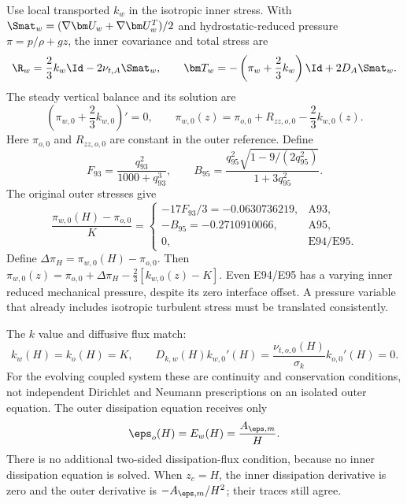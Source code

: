 Use local transported \(k_w\) in the isotropic inner stress.
With \(\Smat_w=(\nabla\bm U_w+\nabla\bm U_w^T)/2\) and
hydrostatic-reduced pressure \(\pi=p/\rho+gz\), the inner
covariance and total stress are
\begin{equation}
 \R_w=\frac23k_w\Id-2\nu_{t,A}\Smat_w,\qquad
 \bm T_w=-\left(\pi_w+\frac23k_w\right)\Id+2D_A\Smat_w .
 \label{mawf:stress}
\end{equation}
The steady vertical balance and its solution are
\begin{equation}
 \left(\pi_{w,0}+\frac23k_{w,0}\right)'=0,\qquad
 \boxed{\pi_{w,0}(z)=\pi_{o,0}+R_{zz,o,0}-\frac23k_{w,0}(z).}
 \label{mawf:pressure}
\end{equation}
Here \(\pi_{o,0}\) and \(R_{zz,o,0}\) are constant in the
outer reference. Define
\begin{equation}
 F_{93}=\frac{q_{93}^2}{1000+q_{93}^3},\qquad
 B_{95}=
 \frac{q_{95}^2\sqrt{1-9/(2q_{95}^2)}}{1+3q_{95}^2}.
\end{equation}
The original outer stresses give
\begin{equation}
 \boxed{\frac{\pi_{w,0}(H)-\pi_{o,0}}K
 =\begin{cases}
 -17F_{93}/3=-0.0630736219,&\text{A93},\\
 -B_{95}=-0.2710910066,&\text{A95},\\
 0,&\text{E94/E95}.
 \end{cases}}
 \label{mawf:pressure-offset}
\end{equation}
Define \(\Delta\pi_H=\pi_{w,0}(H)-\pi_{o,0}\).
Then \(\pi_{w,0}(z)=\pi_{o,0}+\Delta\pi_H
-\frac23[k_{w,0}(z)-K]\).
Even E94/E95 has a varying inner reduced mechanical pressure,
despite its zero interface offset. A pressure variable that already
includes isotropic turbulent stress must be translated consistently.

The \(k\) value and diffusive flux match:
\begin{equation}
 k_w(H)=k_o(H)=K,\qquad
 D_{k,w}(H)k_{w,0}'(H)
 =\frac{\nu_{t,o,0}(H)}{\sigma_k}k_{o,0}'(H)=0.
 \label{mawf:k-interface}
\end{equation}
For the evolving coupled system these are continuity and conservation
conditions, not independent Dirichlet and Neumann prescriptions on
an isolated outer equation. The outer dissipation equation receives
only
\begin{equation}
 \eps_o(H)=E_w(H)=\frac{A_{\eps,m}}H .
 \label{mawf:eps-interface}
\end{equation}
There is no additional two-sided dissipation-flux condition,
because no inner dissipation equation is solved.
When \(z_c=H\), the inner dissipation derivative is zero and the
outer derivative is \(-A_{\eps,m}/H^2\); their traces still agree.

